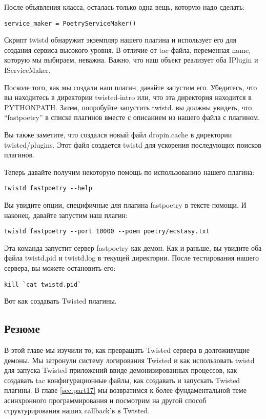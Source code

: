 После объявления класса, осталась только одна вещь, которую надо 
сделать:

 \begin{verbatim}
service_maker = PoetryServiceMaker()
\end{verbatim} 


Скрипт twistd обнаружит экземпляр нашего плагина и использует 
его для создания сервиса высокого уровня. В отличие от tac файла, 
переменная name, которую мы выбираем, неважна. Важно, что наш 
объект реализует оба IPlugin и IServiceMaker.  


Посколе того, как мы создали наш плагин, давайте запустим его. 
Убедитесь, что вы находитесь в директории twisted-intro или, что
эта директория находится в PYTHONPATH. Затем, попробуйте 
запустить twistd. вы должны увидеть, что ``fastpoetry'' в списке 
плагинов вместе с описанием из нашего файла с плагином.


Вы также заметите, что создался новый файл dropin.cache в 
директории twisted/plugins. Этот файл создается twistd для 
ускорения последующих поисков плагинов.


Теперь давайте получим некоторую помощь по использованию 
нашего плагина:

 \begin{verbatim}
twistd fastpoetry --help
\end{verbatim} 


Вы увидите опции, специфичные для плагина fastpoetry в тексте 
помощи. И наконец, давайте запустим наш плагин:

 \begin{verbatim}
twistd fastpoetry --port 10000 --poem poetry/ecstasy.txt
\end{verbatim} 


Эта команда запустит сервер fastpoetry как демон. 
Как и раньше,  вы увидите оба файла twistd.pid и 
twistd.log в текущей директории. После тестирования 
нашего сервера, вы можете остановить его:

 \begin{verbatim}
kill `cat twistd.pid`
\end{verbatim} 

Вот как создавать Twisted плагины.


\subsection{Резюме}

В этой главе мы изучили то, как превращать 
Twisted сервера в долгоживущие демоны. Мы 
затронули систему логирования Twisted и как 
использовать twistd для запуска Twisted приложений 
ввиде демонизированных процессов, 
как создавать tac конфигурационные файлы,
как создавать и запускать Twisted плагины. 
В главе \ref{sec:part17} мы возвратимся к более фундаментальной 
теме асинхронного программирования и посмотрим 
на другой способ структурирования наших callback'в 
в Twisted. 


